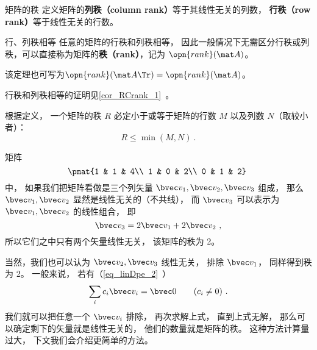 

\begin{definition}{矩阵的秩}
定义矩阵的\textbf{列秩（column rank）}等于其线性无关的列数， \textbf{行秩（row rank）}等于线性无关的行数。
\end{definition}

\begin{theorem}{行、列秩相等}
任意的矩阵的行秩和列秩相等， 因此一般情况下无需区分行秩或列秩，可以直接称为矩阵的\textbf{秩（rank）}，记为 $\opn{rank}(\mat A)$。

该定理也可写为$\opn{rank}(\mat A\Tr)=\opn{rank}(\mat A)$。
\end{theorem}
行秩和列秩相等的证明见\autoref{cor_RCrank_1}~。

\begin{theorem}{}
根据定义， 一个矩阵的秩 $R$ 必定小于或等于矩阵的行数 $M$ 以及列数 $N$（取较小者）：
\begin{equation}
R\leq \min (M, N)~.
\end{equation}
\end{theorem}

\begin{example}{}
矩阵
\begin{equation}\label{eq_MatRnk_1}
\pmat{1 & 1 & 4\\ 1 & 0 & 2\\ 0 & 1 & 2}~
\end{equation}
中， 如果我们把矩阵看做是三个列矢量 $\bvec v_1, \bvec v_2, \bvec v_3$ 组成， 那么 $\bvec v_1, \bvec v_2$ 显然是线性无关的（不共线）， 而 $\bvec v_3$ 可以表示为 $\bvec v_1, \bvec v_2$ 的线性组合， 即
\begin{equation}
\bvec v_3 = 2\bvec v_1 + 2\bvec v_2~,
\end{equation}
所以它们之中只有两个矢量线性无关， 该矩阵的秩为 2。

当然，我们也可以认为 $\bvec v_2, \bvec v_3$ 线性无关， 排除 $\bvec v_1$， 同样得到秩为 2。 一般来说， 若有（\autoref{eq_linDpe_2}~）
\begin{equation}
\sum_i c_i \bvec v_i = \bvec 0 \qquad (c_i \ne 0)~.
\end{equation}
我们就可以把任意一个 $\bvec v_i$ 排除， 再次求解上式， 直到上式无解， 那么可以确定剩下的矢量就是线性无关的， 他们的数量就是矩阵的秩。 这种方法计算量过大， 下文我们会介绍更简单的方法。
\end{example}

